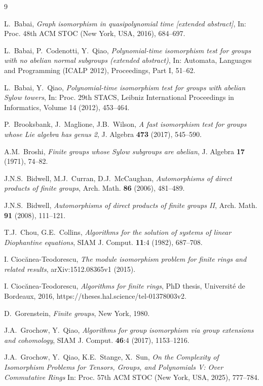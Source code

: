 \documentclass{article}
\begin{document}
\begin{thebibliography}{9}

	L.~Babai, \emph{Graph isomorphism in quasipolynomial time [extended abstract]},
	In: Proc. 48th ACM STOC (New York, USA, 2016), 684--697.

	L.~Babai, P.~Codenotti, Y.~Qiao,
	\emph{Polynomial-time isomorphism test for groups with no abelian normal subgroups (extended abstract)},
	In: Automata, Languages and Programming (ICALP 2012), Proceedings, Part I, 51--62.

	L.~Babai, Y.~Qiao,
	\emph{Polynomial-time isomorphism test for groups with abelian Sylow towers},
	In: Proc. 29th STACS, Leibniz International Proceedings in Informatics, Volume 14 (2012), 453--464.

	P.~Brooksbank, J.~Maglione, J.B.~Wilson,
	\emph{A fast isomorphism test for groups whose Lie algebra has genus 2},
	J. Algebra \textbf{473} (2017), 545--590.
	
	A.M.~Broshi,
	\emph{Finite groups whose Sylow subgroups are abelian},
	J. Algebra \textbf{17} (1971), 74--82.

	J.N.S.~Bidwell, M.J.~Curran, D.J.~McCaughan,
	\emph{Automorphisms of direct products of finite groups},
	Arch. Math. \textbf{86} (2006), 481--489.

	J.N.S.~Bidwell,
	\emph{Automorphisms of direct products of finite groups II},
	Arch. Math. \textbf{91} (2008), 111--121.

	T.J.~Chou, G.E.~Collins, \emph{Algorithms for the solution of systems of linear Diophantine equations},
	SIAM J. Comput. \textbf{11}:4 (1982), 687--708.
	
	I. Cioc\u{a}nea-Teodorescu, \emph{The module isomorphism problem for finite rings and related results}, arXiv:1512.08365v1 (2015).

	I. Cioc\u{a}nea-Teodorescu, \emph{Algorithms for finite rings}, PhD thesis, Universit\'e de Bordeaux, 2016, https://theses.hal.science/tel-01378003v2.

	D.~Gorenstein, \emph{Finite groups}, New York, 1980.

	J.A.~Grochow, Y.~Qiao,
	\emph{Algorithms for group isomorphism via group extensions and cohomology},
	SIAM J. Comput. \textbf{46}:4 (2017), 1153--1216.

	J.A.~Grochow, Y.~Qiao, K.E.~Stange, X.~Sun,
	\emph{On the Complexity of Isomorphism Problems for Tensors, Groups, and Polynomials V: Over Commutative Rings}
	In: Proc. 57th ACM STOC (New York, USA, 2025), 777--784.


\end{thebibliography}
\end{document}

